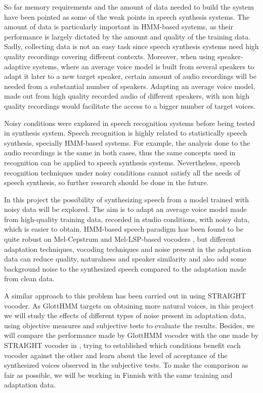 So far memory requirements and the amount of data needed to build the system have been pointed as some of the weak points in speech synthesis systems. The amount of data is particularly important in HMM-based systems, as their performance is largely dictated by the amount and quality of the training data. Sadly, collecting data is not an easy task since speech synthesis systems need high quality recordings covering different contexts. Moreover, when using speaker-adaptive systems, where an average voice model is built from several speakers to adapt it later to a new target speaker, certain amount of audio recordings will be needed from a substantial number of speakers. Adapting an average voice model, made out from high quality recorded audio of different speakers, with non high quality recordings would facilitate the access to a bigger number of target voices.

Noisy conditions were explored in speech recognition systems before being tested in synthesis system. Speech recognition is highly related to statistically speech synthesis, specially HMM-based systems. For example, the analysis done to the audio recordings is the same in both cases, thus the same concepts used in recognition can be applied to speech synthesis systems. Nevertheless, speech recognition techniques under noisy conditions cannot satisfy all the needs of speech synthesis, so further research should be done in the future.

In this project the possibility of synthesizing speech from a model trained with noisy data will be explored. The aim is to adapt an average voice model made from high-quality training data, recorded in studio conditions, with noisy data, which is easier to obtain. HMM-based speech paradigm has been found to be quite robust on Mel-Cepstrum \cite{karhila_jstsp_14, yamagishi2008robustness} and Mel-LSP-based vocoders \cite{Yanagisawa_SSW8}, but different adaptation techniques, vocoding techniques and noise present in the adaptation data can reduce quality, naturalness and speaker similarity and also add some background noise to the synthesized speech compared to the adaptation made from clean data. 

A similar approach to this problem has been carried out in \cite{karhila_jstsp_14} using STRAIGHT vocoder. As GlottHMM targets on obtaining more natural voices, in this project we will study the effects of different types of noise present in adaptation data, using objective measures and subjective tests to evaluate the results. Besides, we will compare the performance made by GlottHMM vocoder with the one made by STRAIGHT vocoder in \cite{karhila_jstsp_14}, trying to established which conditions benefit each vocoder against the other and learn about the level of acceptance of the synthesized voices observed in the subjective tests. To make the comparison as fair as possible, we will be working in Finnish with the same training and adaptation data.
